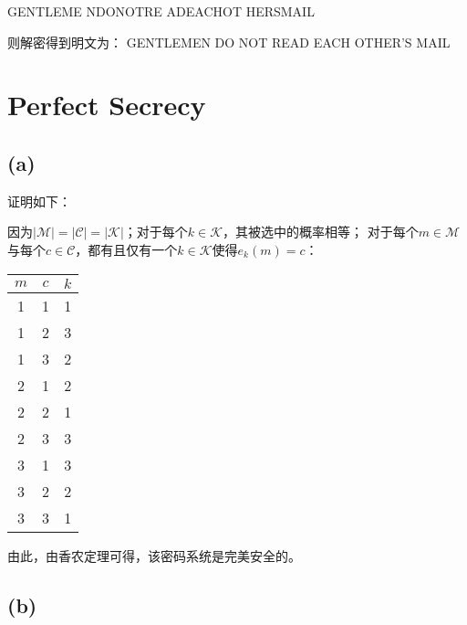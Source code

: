 \documentclass[twoside,11pt]{article}
\begin{document}
GENTLEME NDONOTRE ADEACHOT HERSMAIL

则解密得到明文为：
GENTLEMEN DO NOT READ EACH OTHER'S MAIL

\section{Perfect Secrecy}
\subsection*{(a)}
证明如下：

因为$|\mathcal{M}| = |\mathcal{C}| = |\mathcal{K}|$；对于每个$k \in \mathcal{K}$，其被选中的概率相等；
对于每个$m \in \mathcal{M}$与每个$c \in \mathcal{C}$，都有且仅有一个$k \in \mathcal{K}$使得$e_k(m) = c$：

\begin{tabular}{|c|c|c|}
    \hline
    $m$ & $c$ & $k$ \\
    \hline
    1   & 1   & 1   \\
    1   & 2   & 3   \\
    1   & 3   & 2   \\
    2   & 1   & 2   \\
    2   & 2   & 1   \\
    2   & 3   & 3   \\
    3   & 1   & 3   \\
    3   & 2   & 2   \\
    3   & 3   & 1   \\
    \hline
\end{tabular}

由此，由香农定理可得，该密码系统是完美安全的。

\subsection*{(b)}
\end{document}
